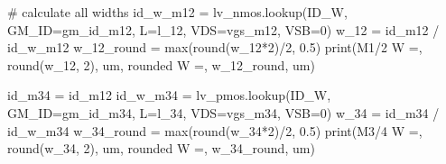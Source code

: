 \documentclass[
  a4paper,
  DIV=11,
  numbers=noendperiod]{scrartcl}
\newenvironment{Shaded}{\begin{snugshade}}{\end{snugshade}}
\newcommand{\BuiltInTok}[1]{\textcolor[rgb]{0.00,0.23,0.31}{#1}}
\newcommand{\CommentTok}[1]{\textcolor[rgb]{0.37,0.37,0.37}{#1}}
\newcommand{\DecValTok}[1]{\textcolor[rgb]{0.68,0.00,0.00}{#1}}
\newcommand{\FloatTok}[1]{\textcolor[rgb]{0.68,0.00,0.00}{#1}}
\newcommand{\NormalTok}[1]{\textcolor[rgb]{0.00,0.23,0.31}{#1}}
\newcommand{\OperatorTok}[1]{\textcolor[rgb]{0.37,0.37,0.37}{#1}}
\newcommand{\StringTok}[1]{\textcolor[rgb]{0.13,0.47,0.30}{#1}}
\begin{document}
\begin{tcolorbox}
\begin{Shaded}
\begin{Highlighting}[]
\CommentTok{\# calculate all widths}
\NormalTok{id\_w\_m12 }\OperatorTok{=}\NormalTok{ lv\_nmos.lookup(}\StringTok{\textquotesingle{}ID\_W\textquotesingle{}}\NormalTok{, GM\_ID}\OperatorTok{=}\NormalTok{gm\_id\_m12, L}\OperatorTok{=}\NormalTok{l\_12, VDS}\OperatorTok{=}\NormalTok{vgs\_m12, VSB}\OperatorTok{=}\DecValTok{0}\NormalTok{)}
\NormalTok{w\_12 }\OperatorTok{=}\NormalTok{ id\_m12 }\OperatorTok{/}\NormalTok{ id\_w\_m12}
\NormalTok{w\_12\_round }\OperatorTok{=} \BuiltInTok{max}\NormalTok{(}\BuiltInTok{round}\NormalTok{(w\_12}\OperatorTok{*}\DecValTok{2}\NormalTok{)}\OperatorTok{/}\DecValTok{2}\NormalTok{, }\FloatTok{0.5}\NormalTok{)}
\BuiltInTok{print}\NormalTok{(}\StringTok{\textquotesingle{}M1/2 W =\textquotesingle{}}\NormalTok{, }\BuiltInTok{round}\NormalTok{(w\_12, }\DecValTok{2}\NormalTok{), }\StringTok{\textquotesingle{}um, rounded W =\textquotesingle{}}\NormalTok{, w\_12\_round, }\StringTok{\textquotesingle{}um\textquotesingle{}}\NormalTok{)}

\NormalTok{id\_m34 }\OperatorTok{=}\NormalTok{ id\_m12}
\NormalTok{id\_w\_m34 }\OperatorTok{=}\NormalTok{ lv\_pmos.lookup(}\StringTok{\textquotesingle{}ID\_W\textquotesingle{}}\NormalTok{, GM\_ID}\OperatorTok{=}\NormalTok{gm\_id\_m34, L}\OperatorTok{=}\NormalTok{l\_34, VDS}\OperatorTok{=}\NormalTok{vgs\_m34, VSB}\OperatorTok{=}\DecValTok{0}\NormalTok{)}
\NormalTok{w\_34 }\OperatorTok{=}\NormalTok{ id\_m34 }\OperatorTok{/}\NormalTok{ id\_w\_m34}
\NormalTok{w\_34\_round }\OperatorTok{=} \BuiltInTok{max}\NormalTok{(}\BuiltInTok{round}\NormalTok{(w\_34}\OperatorTok{*}\DecValTok{2}\NormalTok{)}\OperatorTok{/}\DecValTok{2}\NormalTok{, }\FloatTok{0.5}\NormalTok{) }
\BuiltInTok{print}\NormalTok{(}\StringTok{\textquotesingle{}M3/4 W =\textquotesingle{}}\NormalTok{, }\BuiltInTok{round}\NormalTok{(w\_34, }\DecValTok{2}\NormalTok{), }\StringTok{\textquotesingle{}um, rounded W =\textquotesingle{}}\NormalTok{, w\_34\_round, }\StringTok{\textquotesingle{}um\textquotesingle{}}\NormalTok{)}


\end{Highlighting}
\end{Shaded}
\end{tcolorbox}
\end{document}
